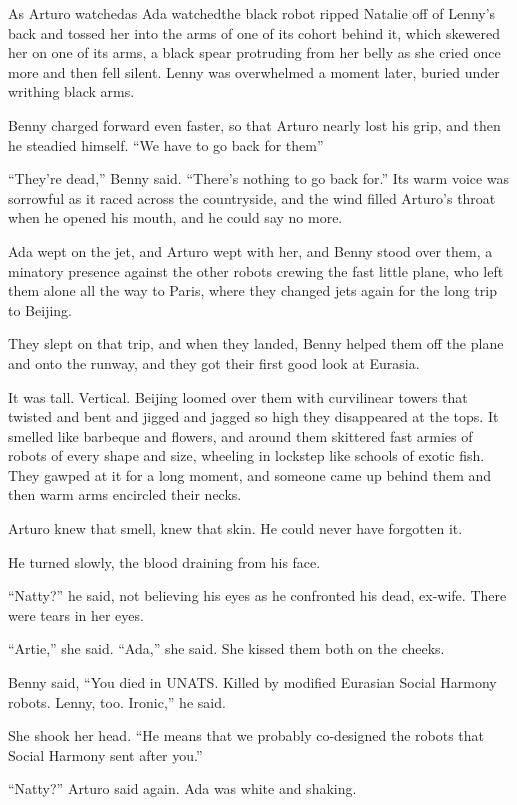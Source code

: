 As Arturo watched{\dash}as Ada watched{\dash}the black robot ripped Natalie off
of Lenny’s back and tossed her into the arms of one of its cohort
behind it, which skewered her on one of its arms, a black spear
protruding from her belly as she cried once more and then fell
silent. Lenny was overwhelmed a moment later, buried under writhing
black arms.

Benny charged forward even faster, so that Arturo nearly lost his
grip, and then he steadied himself. “We have to go back for them{\dash}”

“They’re dead,” Benny said. “There’s nothing to go back for.” Its
warm voice was sorrowful as it raced across the countryside, and
the wind filled Arturo’s throat when he opened his mouth, and he
could say no more.

\tb

Ada wept on the jet, and Arturo wept with her, and Benny stood over
them, a minatory presence against the other robots crewing the fast
little plane, who left them alone all the way to Paris, where they
changed jets again for the long trip to Beijing.

They slept on that trip, and when they landed, Benny helped them
off the plane and onto the runway, and they got their first good
look at Eurasia.

It was tall. Vertical. Beijing loomed over them with curvilinear
towers that twisted and bent and jigged and jagged so high they
disappeared at the tops. It smelled like barbeque and flowers, and
around them skittered fast armies of robots of every shape and
size, wheeling in lockstep like schools of exotic fish. They gawped
at it for a long moment, and someone came up behind them and then
warm arms encircled their necks.

Arturo knew that smell, knew that skin. He could never have
forgotten it.

He turned slowly, the blood draining from his face.

“Natty?” he said, not believing his eyes as he confronted his dead,
ex-wife. There were tears in her eyes.

“Artie,” she said. “Ada,” she said. She kissed them both on the
cheeks.

Benny said, “You died in UNATS. Killed by modified Eurasian Social
Harmony robots. Lenny, too. Ironic,” he said.

She shook her head. “He means that we probably co-designed the
robots that Social Harmony sent after you.”

“Natty?” Arturo said again. Ada was white and shaking.

